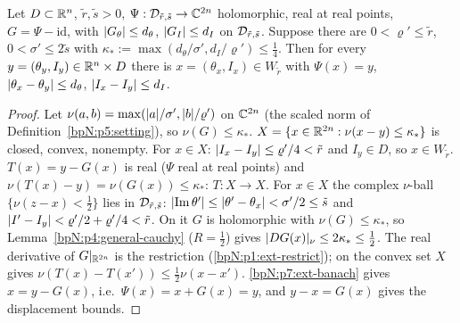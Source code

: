 \begin{lemma}\label{bpN:p7:preimage}
Let $D\subset\mathbb{R}^n$, $\tilde r,\tilde s>0$, $\Psi:\mathcal D_{\tilde r,\tilde s}\to\mathbb{C}^{2n}$ holomorphic, real at real points, $G=\Psi-\mathrm{id}$, with $\lvert G_\theta\rvert\le d_\theta$, $\lvert G_I\rvert\le d_I$ on $\mathcal D_{\tilde r,\tilde s}$. Suppose there are $0<\varrho'\le\tilde r$, $0<\sigma'\le2\tilde s$ with $\kappa_*:=\max(d_\theta/\sigma',d_I/\varrho')\le\frac14$. Then for every $y=(\theta_y,I_y)\in\mathbb{R}^n\times D$ there is $x=(\theta_x,I_x)\in W_{\tilde r}$ with $\Psi(x)=y$, $\lvert \theta_x-\theta_y\rvert\le d_\theta$, $\lvert I_x-I_y\rvert\le d_I$.
\end{lemma}
\begin{proof}
Let $\nu(a,b)=\max(\lvert a\rvert/\sigma',\lvert b\rvert/\varrho')$ on $\mathbb{C}^{2n}$ (the scaled norm of Definition~\ref{bpN:p5:setting}), so $\nu(G)\le\kappa_*$.
\label{stepN:p7:pi-set} $X=\{x\in\mathbb{R}^{2n}:\nu(x-y)\le\kappa_*\}$ is closed, convex, nonempty. For $x\in X$: $\lvert I_x-I_y\rvert\le\varrho'/4<\tilde r$ and $I_y\in D$, so $x\in W_{\tilde r}$.
\label{stepN:p7:pi-self} $T(x)=y-G(x)$ is real ($\Psi$ real at real points) and $\nu(T(x)-y)=\nu(G(x))\le\kappa_*$: $T:X\to X$.
\label{stepN:p7:pi-contr} For $x\in X$ the complex $\nu$-ball $\{\nu(z-x)<\frac12\}$ lies in $\mathcal D_{\tilde r,\tilde s}$: $\lvert \operatorname{Im}\theta'\rvert\le\lvert \theta'-\theta_x\rvert<\sigma'/2\le\tilde s$ and $\lvert I'-I_y\rvert<\varrho'/2+\varrho'/4<\tilde r$. On it $G$ is holomorphic with $\nu(G)\le\kappa_*$, so Lemma~\ref{bpN:p4:general-cauchy} ($R=\frac12$) gives $\lvert DG(x)\rvert_{\nu}\le2\kappa_*\le\frac12$. The real derivative of $G|_{\mathbb{R}^{2n}}$ is the restriction (\ref{bpN:p1:ext-restrict});  on the convex set $X$ gives $\nu(T(x)-T(x'))\le\frac12\nu(x-x')$.
\label{stepN:p7:pi-fix} \ref{bpN:p7:ext-banach} gives $x=y-G(x)$, i.e.\ $\Psi(x)=x+G(x)=y$, and $y-x=G(x)$ gives the displacement bounds.
\end{proof}

